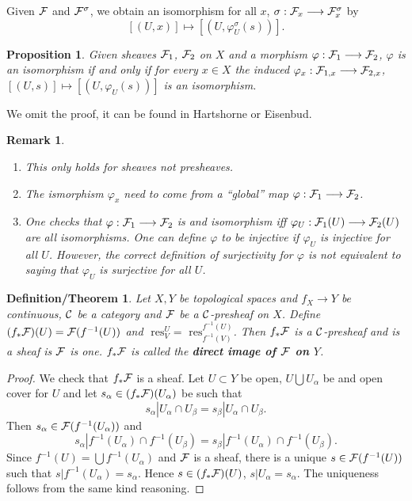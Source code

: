 \documentclass[11pt]{article}
\newtheorem{prop}[thm]{Proposition}
\newtheorem{rmk}[thm]{Remark}
\newtheorem{dfn/thm}[thm]{Definition/Theorem}
\newcommand{\res}{\text{ res}}
\newcommand{\calf}{{\cal F}}
\newcommand{\calc}{{\cal C}}
\begin{document}
Given $\calf$ and $\calf^\sigma$, we obtain an isomorphism for all $x$, $\sigma: \calf_x \longrightarrow \calf^\sigma_x$ by
$$
[(U,x)] \longmapsto [(U,\varphi^\sigma_U(s))].
$$

\begin{prop}
    Given sheaves $\calf_1$, $\calf_2$ on $X$ and a morphism $\varphi: \calf_1 \longrightarrow \calf_2$, $\varphi$ is an isomorphism if and only if for every $x\in X$ the induced $\varphi_x: \calf_{1,x} \longrightarrow \calf_{2,x}$, $[(U,s)] \longmapsto [(U, \varphi_U(s))]$ is an isomorphism.
\end{prop}

We omit the proof, it can be found in Hartshorne or Eisenbud.

\begin{rmk}
    \begin{enumerate}[label=(\arabic*)]
        \item 
        This only holds for sheaves not presheaves.
        \item
        The ismorphism $\varphi_x$ need to come from a ``global'' map $\varphi: \calf_1 \longrightarrow \calf_2$.
        \item
        One checks that $\varphi: \calf_1 \longrightarrow \calf_2$ is and isomorphism iff $\varphi_U: \calf_1(U) \longrightarrow \calf_2(U)$ are all isomorphisms. One can define $\varphi$ to be injective if $\varphi_U$ is injective for all $U$. However, the correct definition of surjectivity for $\varphi$ is not equivalent to saying that $\varphi_U$ is surjective for all $U$.
    \end{enumerate}
\end{rmk}

\begin{dfn/thm}
    Let $X,Y$ be topological spaces and $f_X\longrightarrow Y$ be continuous, $\calc$ be a category and $\calf$ be a $\calc$-presheaf on $X$. Define $(f_* \calf)(U)=\calf (f^{-1}(U))$ and $\res_V^U = \res_{f^{-1}(V)}^{f^{-1}(U)}$. Then $f_*\calf$ is a $\calc$-presheaf and is a sheaf is $\calf$ is one.
    $f_*\calf$ is called the \textbf{direct image of $\calf$ on $Y$}.
\end{dfn/thm}

\begin{proof}
    We check that $f_*\calf$ is a sheaf. Let $U\subset Y$ be open, $U \bigcup U_\alpha$ be and open cover for $U$ and let $s_\alpha \in (f_* \calf)(U_\alpha)$ be such that 
    $$
    s_\alpha|U_\alpha\cap U_\beta = s_\beta|U_\alpha \cap U_\beta.
    $$
    Then $s_\alpha \in \calf(f^{-1}(U_\alpha))$ and
    $$
    s_\alpha|f^{-1}(U_\alpha)\cap f^{-1}(U_\beta) = s_\beta|f^{-1}(U_\alpha) \cap f^{-1}(U_\beta).
    $$
    Since $f^{-1}(U) = \bigcup f^{-1}(U_\alpha)$ and $\calf$ is a sheaf, there is a unique $s\in\calf(f^{-1}(U))$ such that $s|f^{-1}(U_\alpha) = s_\alpha$. Hence $s \in (f_*\calf)(U)$, $s|U_\alpha = s_\alpha$. The uniqueness follows from the same kind reasoning.
\end{proof}
\end{document}
